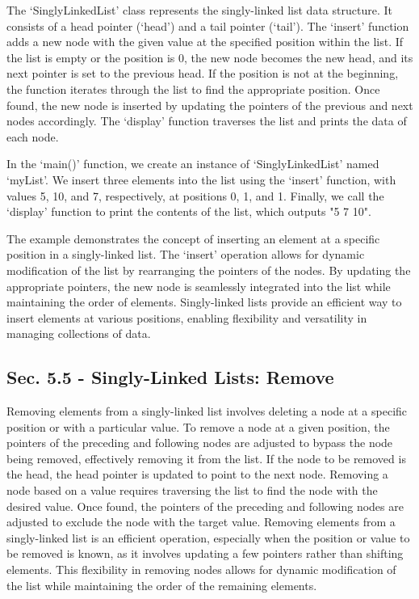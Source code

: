 \begin{solution}
    \horizontalline

    The `SinglyLinkedList' class represents the singly-linked list data structure. It consists of a head pointer (`head') and a tail pointer (`tail'). The `insert' function adds a new node with the given value at the specified position within the 
    list. If the list is empty or the position is 0, the new node becomes the new head, and its next pointer is set to the previous head. If the position is not at the beginning, the function iterates through the list to find the appropriate position. 
    Once found, the new node is inserted by updating the pointers of the previous and next nodes accordingly. The `display' function traverses the list and prints the data of each node.

    In the `main()' function, we create an instance of `SinglyLinkedList' named `myList'. We insert three elements into the list using the `insert' function, with values 5, 10, and 7, respectively, at positions 0, 1, and 1. Finally, we call the `display' 
    function to print the contents of the list, which outputs "5 7 10".

    The example demonstrates the concept of inserting an element at a specific position in a singly-linked list. The `insert' operation allows for dynamic modification of the list by rearranging the pointers of the nodes. By updating the appropriate 
    pointers, the new node is seamlessly integrated into the list while maintaining the order of elements. Singly-linked lists provide an efficient way to insert elements at various positions, enabling flexibility and versatility in managing collections of data.
\end{solution}

\subsection*{Sec. 5.5 - Singly-Linked Lists: Remove}

Removing elements from a singly-linked list involves deleting a node at a specific position or with a particular value. To remove a node at a given position, the pointers of the preceding and following nodes are adjusted to bypass the node being removed, effectively 
removing it from the list. If the node to be removed is the head, the head pointer is updated to point to the next node. Removing a node based on a value requires traversing the list to find the node with the desired value. Once found, the pointers of the preceding 
and following nodes are adjusted to exclude the node with the target value. Removing elements from a singly-linked list is an efficient operation, especially when the position or value to be removed is known, as it involves updating a few pointers rather than shifting 
elements. This flexibility in removing nodes allows for dynamic modification of the list while maintaining the order of the remaining elements.


